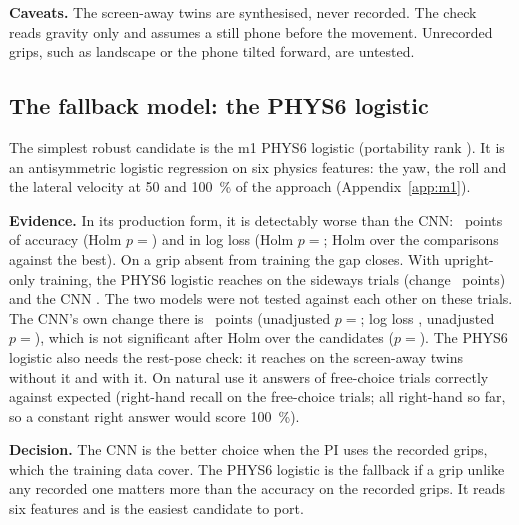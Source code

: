 \textbf{Caveats.}
The screen-away twins are synthesised, never recorded.
The check reads gravity only and assumes a still phone before the movement.
Unrecorded grips, such as landscape or the phone tilted forward, are untested.


\subsection{The fallback model: the PHYS6 logistic}\label{app:final:fallback}

The simplest robust candidate is the m1 PHYS6 logistic (portability rank ).
It is an antisymmetric logistic regression on six physics features: the yaw, the roll and the lateral velocity at 50 and 100~\% of the approach (Appendix~\ref{app:m1}).

\textbf{Evidence.}
In its production form, it is detectably worse than the CNN: ~points of accuracy (Holm $p = {}$) and  in log loss (Holm $p = {}$; Holm over the comparisons against the best).
On a grip absent from training the gap closes.
With upright-only training, the PHYS6 logistic reaches  on the sideways trials (change ~points) and the CNN .
The two models were not tested against each other on these trials.
The CNN's own change there is ~points (unadjusted $p = {}$; log loss , unadjusted $p = {}$), which is not significant after Holm over the candidates ($p = {}$).
The PHYS6 logistic also needs the rest-pose check: it reaches  on the screen-away twins without it and  with it.
On natural use it answers  of  free-choice trials correctly against  expected (right-hand recall on the free-choice trials; all right-hand so far, so a constant right answer would score 100~\%).

\textbf{Decision.}
The CNN is the better choice when the PI uses the recorded grips, which the training data cover.
The PHYS6 logistic is the fallback if a grip unlike any recorded one matters more than the accuracy on the recorded grips.
It reads six features and is the easiest candidate to port.

